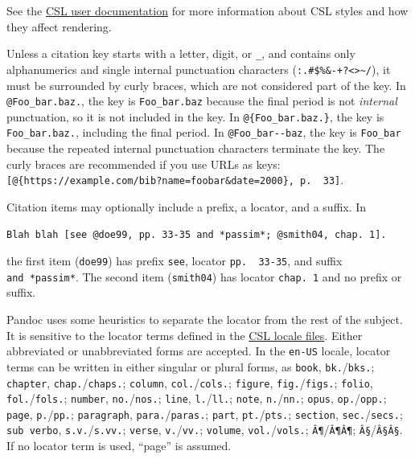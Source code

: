 \documentclass[
]{article}
\begin{document}
See the \href{https://citationstyles.org/authors/}{CSL user
documentation} for more information about CSL styles and how they affect
rendering.

Unless a citation key starts with a letter, digit, or \texttt{\_}, and
contains only alphanumerics and single internal punctuation characters
(\texttt{:.\#\$\%\&-+?\textless{}\textgreater{}\textasciitilde{}/}), it
must be surrounded by curly braces, which are not considered part of the
key. In \texttt{@Foo\_bar.baz.}, the key is \texttt{Foo\_bar.baz}
because the final period is not \emph{internal} punctuation, so it is
not included in the key. In \texttt{@\{Foo\_bar.baz.\}}, the key is
\texttt{Foo\_bar.baz.}, including the final period. In
\texttt{@Foo\_bar-\/-baz}, the key is \texttt{Foo\_bar} because the
repeated internal punctuation characters terminate the key. The curly
braces are recommended if you use URLs as keys:
\texttt{{[}@\{https://example.com/bib?name=foobar\&date=2000\},\ p.\ \ 33{]}}.

Citation items may optionally include a prefix, a locator, and a suffix.
In

\begin{verbatim}
Blah blah [see @doe99, pp. 33-35 and *passim*; @smith04, chap. 1].
\end{verbatim}

the first item (\texttt{doe99}) has prefix \texttt{see}, locator
\texttt{pp.\ \ 33-35}, and suffix \texttt{and\ *passim*}. The second
item (\texttt{smith04}) has locator \texttt{chap.\ 1} and no prefix or
suffix.

Pandoc uses some heuristics to separate the locator from the rest of the
subject. It is sensitive to the locator terms defined in the
\href{https://github.com/citation-style-language/locales}{CSL locale
files}. Either abbreviated or unabbreviated forms are accepted. In the
\texttt{en-US} locale, locator terms can be written in either singular
or plural forms, as \texttt{book}, \texttt{bk.}/\texttt{bks.};
\texttt{chapter}, \texttt{chap.}/\texttt{chaps.}; \texttt{column},
\texttt{col.}/\texttt{cols.}; \texttt{figure},
\texttt{fig.}/\texttt{figs.}; \texttt{folio},
\texttt{fol.}/\texttt{fols.}; \texttt{number},
\texttt{no.}/\texttt{nos.}; \texttt{line}, \texttt{l.}/\texttt{ll.};
\texttt{note}, \texttt{n.}/\texttt{nn.}; \texttt{opus},
\texttt{op.}/\texttt{opp.}; \texttt{page}, \texttt{p.}/\texttt{pp.};
\texttt{paragraph}, \texttt{para.}/\texttt{paras.}; \texttt{part},
\texttt{pt.}/\texttt{pts.}; \texttt{section},
\texttt{sec.}/\texttt{secs.}; \texttt{sub\ verbo},
\texttt{s.v.}/\texttt{s.vv.}; \texttt{verse}, \texttt{v.}/\texttt{vv.};
\texttt{volume}, \texttt{vol.}/\texttt{vols.};
\texttt{Â¶}/\texttt{Â¶Â¶}; \texttt{Â§}/\texttt{Â§Â§}. If no locator term
is used, ``page'' is assumed.
\end{document}

